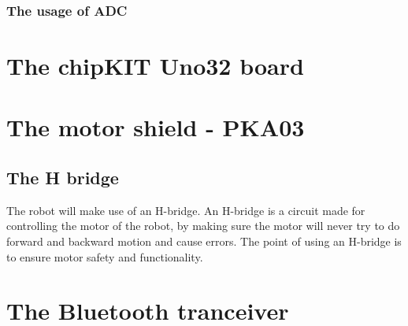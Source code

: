 \subsubsection{The usage of ADC}

\section{The chipKIT Uno32 board}


\section{The motor shield - PKA03}

\subsection{The H bridge}
The robot will make use of an H-bridge. An H-bridge is a circuit made for controlling the motor of the robot, by making sure the motor will never try to do forward and backward motion  and cause errors. The point of using an H-bridge is to ensure motor safety and functionality.

\section{The Bluetooth tranceiver}

